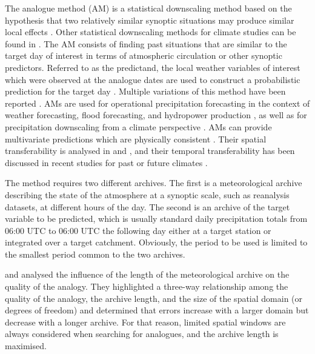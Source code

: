 \documentclass[hess, manuscript]{copernicus}
\begin{document}
	
	
	\introduction  %
	\label{sec:introduction}
	
	The analogue method (AM) is a statistical downscaling method based on the hypothesis that two relatively similar synoptic situations may produce similar local effects \citep{Lorenz1956, Lorenz1969}. Other statistical downscaling methods for climate studies can be found in \citet{Maraun2010}. The AM consists of finding past situations that are similar to the target day of interest in terms of atmospheric circulation or other synoptic predictors. Referred to as the predictand, the local weather variables of interest which were observed at the analogue dates are used to construct a probabilistic prediction for the target day \citep{Duband1970, Zorita1999}. Multiple variations of this method have been reported \citep{BenDaoud2016}. AMs are used for operational precipitation forecasting in the context of weather forecasting, flood forecasting, and hydropower production \citep[e.g.,][]{Bontron2005, Hamill2006, Desaint2008a, GarciaHernandez2009b, Bliefernicht2010, Marty2010, Marty2012, Horton2012, Obled2014, Hamill2015, BenDaoud2016}, as well as for precipitation downscaling from a climate perspective \citep[e.g.][]{Radanovics2013, Chardon2014, Dayon2015}. AMs can provide multivariate predictions which are physically consistent \citep{Raynaud2016b}. Their spatial transferability is analysed in \citet{Chardon2014} and \citet{Radanovics2013}, and their temporal transferability has been discussed in recent studies for past or future climates \citep{Dayon2015, Caillouet2016}.
	
	The method requires two different archives. The first is a meteorological archive describing the state of the atmosphere at a synoptic scale, such as reanalysis datasets, at different hours of the day. The second is an archive of the target variable to be predicted, which is usually standard daily precipitation totals from 06:00 UTC to 06:00 UTC the following day either at a target station or integrated over a target catchment. Obviously, the period to be used is limited to the smallest period common to the two archives.
	
	\citet{Ruosteenoja1988} and \citet{Vandendool1994} analysed the influence of the length of the meteorological archive on the quality of the analogy. They highlighted a three-way relationship among the quality of the analogy, the archive length, and the size of the spatial domain (or degrees of freedom) and determined that errors increase with a larger domain but decrease with a longer archive. For that reason, limited spatial windows are always considered when searching for analogues, and the archive length is maximised. 
	
\end{document}
